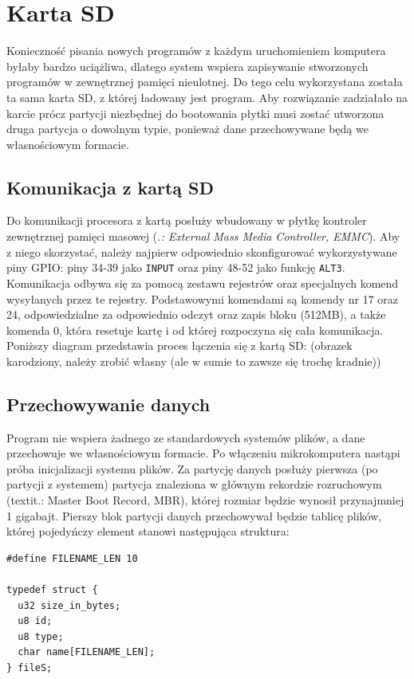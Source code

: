 \documentclass[shortabstract]{iithesis}
\begin{document}
\section{Karta SD}
Konieczność pisania nowych programów z każdym uruchomieniem komputera byłaby bardzo uciążliwa, dlatego system wspiera zapisywanie stworzonych programów w zewnętrznej pamięci nieulotnej. Do tego celu wykorzystana została ta sama karta SD, z której ładowany jest program. Aby rozwiązanie zadziałało na karcie prócz partycji niezbędnej do bootowania płytki musi zostać utworzona druga partycja o dowolnym typie, ponieważ dane przechowywane będą we własnościowym formacie. 
\subsection{Komunikacja z kartą SD}
Do komunikacji procesora z kartą posłuży wbudowany w płytkę kontroler zewnętrznej pamięci masowej (\textit{.: External Mass Media Controller, EMMC}). Aby z niego skorzystać, należy najpierw odpowiednio skonfigurować wykorzystywane piny GPIO: piny 34-39 jako \texttt{INPUT} oraz piny 48-52 jako funkcję \texttt{ALT3}. Komunikacja odbywa się za pomocą zestawu rejestrów oraz specjalnych komend wysyłanych przez te rejestry. Podstawowymi komendami są komendy nr 17 oraz 24, odpowiedzialne za odpowiednio odczyt oraz zapis bloku (512MB), a także komenda 0, która resetuje kartę i od której rozpoczyna się cała komunikacja.
Poniższy diagram przedstawia proces łączenia się z kartą SD:
(obrazek karodziony, należy zrobić własny (ale w sumie to zawsze się trochę kradnie))
\subsection{Przechowywanie danych}
Program nie wspiera żadnego ze standardowych systemów plików, a dane przechowuje we własnościowym formacie. Po włączeniu mikrokomputera nastąpi próba inicjalizacji systemu plików. Za partycję danych posłuży pierwsza (po partycji z systemem) partycja znaleziona w głównym rekordzie rozruchowym (textit{.: Master Boot Record, MBR}), której rozmiar będzie wynosił przynajmniej 1 gigabajt. Pierszy blok partycji danych przechowywał będzie tablicę plików, której pojedyńczy element stanowi następująca struktura:
\begin{verbatim}
#define FILENAME_LEN 10

typedef struct {
  u32 size_in_bytes;
  u8 id;
  u8 type;
  char name[FILENAME_LEN];
} fileS;
\end{verbatim}
\end{document}
